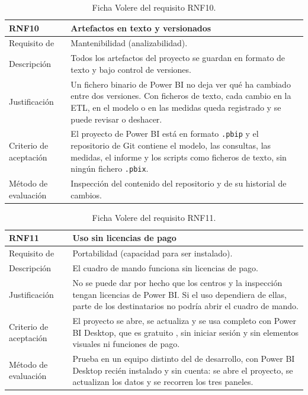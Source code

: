 \documentclass[12pt, a4paper, oneside]{report}
\begin{document}
\begin{table}[!htbp]
\centering
\small
{}\renewcommand{\arraystretch}{1.0}\setlength{\defaultaddspace}{3pt}
\begin{tabularx}{\textwidth}{@{} >{\raggedright\arraybackslash}p{3.4cm} X @{}}
\toprule
\textbf{RNF10} & \textbf{Artefactos en texto y versionados} \\ \midrule
Requisito de & Mantenibilidad (analizabilidad). \\ \addlinespace
Descripción & Todos los artefactos del proyecto se guardan en formato de texto y bajo control de versiones. \\ \addlinespace
Justificación & Un fichero binario de Power BI no deja ver qué ha cambiado entre dos versiones. Con ficheros de texto, cada cambio en la ETL, en el modelo o en las medidas queda registrado y se puede revisar o deshacer. \\ \addlinespace
Criterio de aceptación & El proyecto de Power BI está en formato \texttt{.pbip} y el repositorio de Git contiene el modelo, las consultas, las medidas, el informe y los scripts como ficheros de texto, sin ningún fichero \texttt{.pbix}. \\ \addlinespace
Método de evaluación & Inspección del contenido del repositorio y de su historial de cambios. \\ \bottomrule
\end{tabularx}
\caption{Ficha Volere del requisito RNF10.}
\label{tab:rnf10}
\end{table}

\begin{table}[!htbp]
\centering
\small
{}\renewcommand{\arraystretch}{1.0}\setlength{\defaultaddspace}{3pt}
\begin{tabularx}{\textwidth}{@{} >{\raggedright\arraybackslash}p{3.4cm} X @{}}
\toprule
\textbf{RNF11} & \textbf{Uso sin licencias de pago} \\ \midrule
Requisito de & Portabilidad (capacidad para ser instalado). \\ \addlinespace
Descripción & El cuadro de mando funciona sin licencias de pago. \\ \addlinespace
Justificación & No se puede dar por hecho que los centros y la inspección tengan licencias de Power BI. Si el uso dependiera de ellas, parte de los destinatarios no podría abrir el cuadro de mando. \\ \addlinespace
Criterio de aceptación & El proyecto se abre, se actualiza y se usa completo con Power BI Desktop, que es gratuito \cite{ms_powerbi_pricing}, sin iniciar sesión y sin elementos visuales ni funciones de pago. \\ \addlinespace
Método de evaluación & Prueba en un equipo distinto del de desarrollo, con Power BI Desktop recién instalado y sin cuenta: se abre el proyecto, se actualizan los datos y se recorren los tres paneles. \\ \bottomrule
\end{tabularx}
\caption{Ficha Volere del requisito RNF11.}
\label{tab:rnf11}
\end{table}
\end{document}
